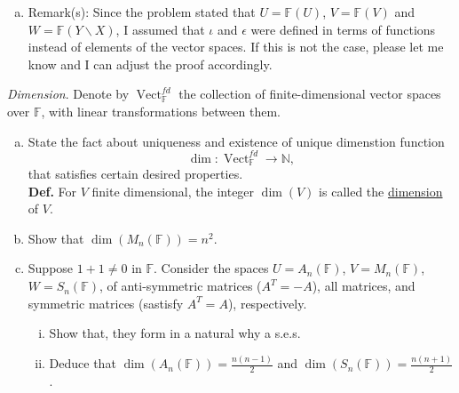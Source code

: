 \documentclass{article}
\begin{document}
\begin{enumerate}[a)]
\begin{enumerate}[i)]
\begin{proof}
            for all $g \in V$ and $x \in W$. This map is surjective because for any $h \in W$, we can define a function $g \in V$ by
            \[
                g(x) = \begin{cases}
                    h(x) & \text{if } x \in W \\
                    0 & \text{if } x \notin W
                \end{cases}
            \]
            such that $\epsilon(g) = h$. Finally, we need to show that $\operatorname{im}(\iota) = \ker(\epsilon)$. If $f \in U$, then $\epsilon(\iota(f)) = 0$ since $\iota(f)$ is zero outside of $U$. Conversely, if $g \in V$ and $\epsilon(g) = 0$, then $g(x) = 0$ for all $x \in W$, which means that $g$ must be in the image of $\iota$. Therefore, we have shown that the sequence
            \[
                0 \xrightarrow{} U \xrightarrow{\iota} V \xrightarrow{\epsilon} W \xrightarrow{} 0
            \]
            is a short exact sequence.
        \end{proof}
    \end{enumerate}
    \item[] Remark(s): Since the problem stated that $U = \mathbb{F}(U)$, $V = \mathbb{F}(V)$ and $W = \mathbb{F}(Y \backslash X)$, I assumed that $\iota$ and $\epsilon$ were defined in terms of functions instead of elements of the vector spaces. If this is not the case, please let me know and I can adjust the proof accordingly.
\end{enumerate}


\begin{problem}
    \textit{Dimension}. Denote by $\operatorname{Vect}_{\mathbb{F}}^{fd}$ the collection of finite-dimensional vector spaces over $\mathbb{F}$, with linear transformations between them.
    \begin{enumerate}[a)]
        \item State the fact about uniqueness and existence of unique dimenstion function
        \[
            \dim: \operatorname{Vect}_{\mathbb{F}}^{fd} \to \mathbb{N},
        \]
        that satisfies certain desired properties. \\
        \textbf{Def.} For $V$ finite dimensional, the integer $\dim(V)$ is called the \underline{dimension} of $V$.
        \item Show that $\dim(M_n(\mathbb{F})) = n^2$.
        \item Suppose $1 + 1 \neq 0$ in $\mathbb{F}$. Consider the spaces $U = A_n(\mathbb{F})$, $V = M_n(\mathbb{F})$, $W = S_n(\mathbb{F})$, of anti-symmetric matrices ($A^T = -A$), all matrices, and symmetric matrices (sastisfy $A^T = A$), respectively. 
        \begin{enumerate}[i)]
            \item Show that, they form in a natural why a s.e.s.
            \item Deduce that $\dim(A_n(\mathbb{F})) = \frac{n(n-1)}{2}$ and $\dim(S_n(\mathbb{F})) = \frac{n(n+1)}{2}$.
        \end{enumerate}
    \end{enumerate}
\end{problem}
\end{document}
